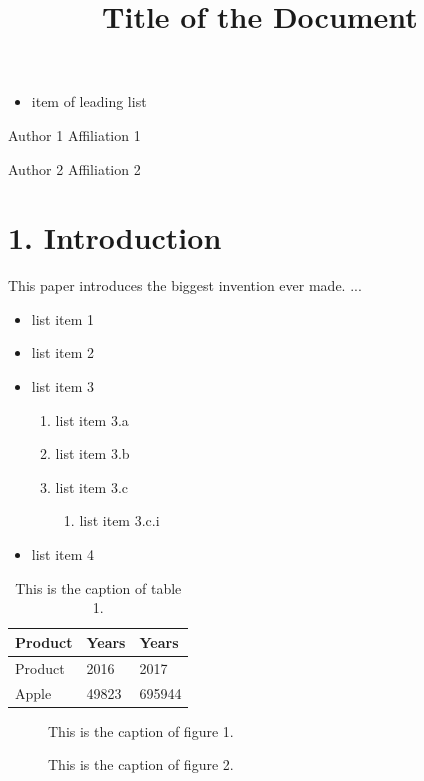 \documentclass[11pt,a4paper]{article}
\title{Title of the Document}
\date{}
\begin{document}
\maketitle

\begin{itemize}
\item item of leading list
\end{itemize}

Author 1
Affiliation 1

Author 2
Affiliation 2

\section{1. Introduction}

This paper introduces the biggest invention ever made. ...

\begin{itemize}
\item list item 1
\item list item 2
\item list item 3
  \begin{enumerate}
\item list item 3.a
\item list item 3.b
\item list item 3.c
    \begin{enumerate}
\item list item 3.c.i
    \end{enumerate}
  \end{enumerate}
\item list item 4
\end{itemize}

\begin{table}[h]
\caption{This is the caption of table 1.}
\begin{tabular}{|l|l|l|}
\hline
Product & Years & Years \\ \hline
Product & 2016 & 2017 \\ \hline
Apple & 49823 & 695944 \\ \hline
\end{tabular}
\end{table}

\begin{figure}[h]
\caption{This is the caption of figure 1.}
\end{figure}

\begin{figure}[h]
\caption{This is the caption of figure 2.}
\end{figure}
\end{document}

